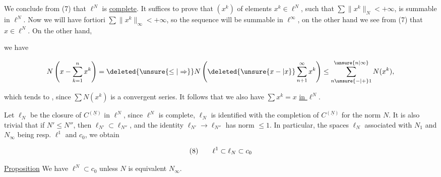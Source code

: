 
We conclude from (7) that $\ell^N$ is \uline{complete}. It suffices to prove that   $(x^k)$  of elements $x^k\in\ell^N$, such that $\sum\lVert x^{k}\rVert_N<+\infty$, is summable in $\ell^N$. Now  we will have  fortiori $\sum\lVert x^k\rVert_\infty<+\infty$, so the  sequence will be summable in $\ell^\infty$,  on the other hand we  see from (7) that $x\in\ell^N$. On the other hand,

{\reversemarginpar{}}

we have

\[
N\left(x-\sum_{k=1}^n x^k\right)=\deleted{\unsure{\leq|\Rightarrow}}N\left(\deleted{\unsure{x-|x}}\sum_{n+1}^\infty x^k\right)\leq\sum_{n\unsure{-|+}1}^{\unsure{n|\infty}}N(x^k),
\]

which tends to , since $\sum N(x^k)$ is a convergent series. It follows that we also have $\sum x^k=x$ \uline{in $\ell^N$}.

Let $\ell_N$ be the closure of $C^{(\underline N)}$ in $\ell^N$, since $\ell^N$ is complete, $\ell_N$ is identified with the completion of $C^{(\underline N)}$ for the norm $N$. It is also trivial that if $N'\leq N''$, then $\ell_{N'}\subset\ell_{N''}$, and the identity  $\ell_{N'}\to\ell_{N''}$ has norm $\leq 1$. In particular, the spaces $\ell_N$ associated with $N_1$ and $N_\infty$ being resp. $\ell^1$ and $c_0$, we obtain

\[
\begin{array}{@{}l@{\qquad}l@{}}
(8)&\displaystyle \ell^1\subset\ell_N\subset c_0
\end{array}
\]

{\reversemarginpar{}}

\uline{Proposition} We have $\ell^N\subset c_0$ unless $N$ is equivalent  $N_\infty$.

